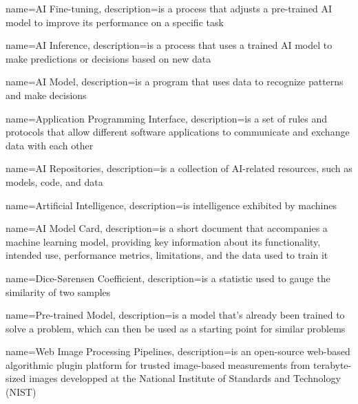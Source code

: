 
{
    name=AI Fine-tuning,
    description={is a process that adjusts a pre-trained AI model to improve
    its performance on a specific task}
}

{
    name=AI Inference,
    description={is a process that uses a trained AI model to make predictions
    or decisions based on new data}
}

{
    name=AI Model,
    description={is a program that uses data to recognize patterns and make
    decisions}
}

{
    name=Application Programming Interface,
    description={is a set of rules and protocols that allow different software
    applications to communicate and exchange data with each other}
}

{
    name=AI Repositories,
    description={is a collection of AI-related resources, such as models, code,
    and data}
}

{
    name=Artificial Intelligence,
    description={is intelligence exhibited by machines}
}

{
    name=AI Model Card,
    description={is a short document that accompanies a machine learning model,
    providing key information about its functionality, intended use,
    performance metrics, limitations, and the data used to train it}
}

{
    name=Dice-Sørensen Coefficient,
    description={is a statistic used to gauge the similarity of two samples}
}

{
    name=Pre-trained Model,
    description={is a model that's already been trained to solve a problem,
    which can then be used as a starting point for similar problems}
}

{
    name=Web Image Processing Pipelines,
    description={is an open-source web-based algorithmic plugin platform for
    trusted image-based measurements from terabyte-sized images developped at
    the National Institute of Standards and Technology (NIST)}
}

